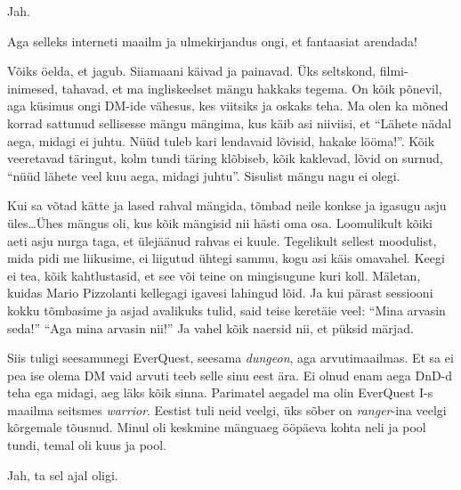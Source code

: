 
Jah.
                 

Aga selleks interneti maailm ja ulmekirjandus ongi, et fantaasiat arendada!


Võiks öelda, et jagub. Siiamaani käivad ja painavad. Üks seltskond, 
filmi-inimesed, tahavad, et ma ingliskeelset mängu hakkaks tegema. On kõik 
põnevil, aga küsimus ongi DM-ide vähesus, kes viitsiks ja oskaks teha. Ma olen 
ka mõned korrad sattunud sellisesse mängu mängima, kus käib asi niiviisi, et 
\enquote{Lähete nädal aega, midagi ei juhtu. Nüüd tuleb kari lendavaid lõvisid, 
hakake lööma!}. Kõik veeretavad täringut, kolm tundi täring klõbiseb, kõik 
kaklevad, lõvid on surnud, \enquote{nüüd lähete veel kuu aega, midagi juhtu}.  
Sisulist mängu nagu ei olegi. 

Kui sa võtad kätte ja lased rahval mängida, tõmbad neile konkse ja igasugu asju 
üles\ldots Ühes mängus oli, kus kõik mängisid nii hästi oma osa. Loomulikult 
kõiki aeti asju nurga taga, et ülejäänud rahvas ei kuule. Tegelikult sellest 
moodulist, mida pidi me  liikusime, ei liigutud ühtegi sammu, kogu asi käis 
omavahel. Keegi ei tea, kõik kahtlustasid, et see või teine on mingisugune kuri 
koll. Mäletan, kuidas Mario Pizzolanti  kellegagi  igavesi lahingud lõid. Ja kui pärast 
sessiooni kokku tõmbasime ja asjad avalikuks tulid, said teise keretäie veel: 
\enquote{Mina arvasin seda!} \enquote{Aga mina arvasin nii!} Ja vahel kõik 
naersid nii, et püksid märjad. 

Siis tuligi seesamunegi EverQuest, seesama \emph{dungeon}, aga 
arvutimaailmas. Et sa ei pea ise olema DM vaid arvuti teeb selle sinu eest ära. 
Ei olnud enam aega DnD-d teha ega midagi, aeg läks kõik sinna. Parimatel 
aegadel ma olin  EverQuest I-s maailma seitsmes \emph{warrior}. Eestist tuli 
neid veelgi, üks sõber on \emph{ranger}-ina veelgi kõrgemale tõusnud. Minul oli 
keskmine mänguaeg ööpäeva kohta neli ja pool tundi, temal oli kuus ja pool. 


Jah, ta sel ajal oligi.
                 

